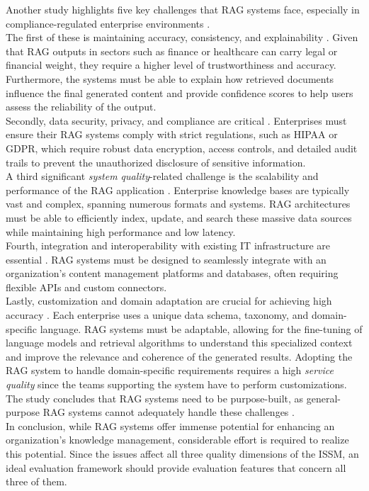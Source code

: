 \documentclass[
	english,
	ruledheaders=section,%
	class=report,%
	thesis={type=bachelor},%
	accentcolor=1b,%
	custommargins=true,%
	marginpar=false,%
	parskip=half-,%
	fontsize=11pt,%
	DIV=14,
]{tudapub}
\begin{document}
Another study highlights five key challenges that RAG systems face, especially in compliance-regulated enterprise environments \parencite[p.~6]{Bruckhaus2024RAG}.\\
The first of these is maintaining accuracy, consistency, and explainability \parencite[p.~6]{Bruckhaus2024RAG}. Given that RAG outputs in sectors such as finance or healthcare can carry legal or financial weight, they require a higher level of trustworthiness and accuracy. Furthermore, the systems must be able to explain how retrieved documents influence the final generated content and provide confidence scores to help users assess the reliability of the output.\\
Secondly, data security, privacy, and compliance are critical \parencite[p.~6]{Bruckhaus2024RAG}. Enterprises must ensure their RAG systems comply with strict regulations, such as HIPAA or GDPR, which require robust data encryption, access controls, and detailed audit trails to prevent the unauthorized disclosure of sensitive information.\\
A third significant \textit{system quality}-related challenge is the scalability and performance of the RAG application \parencite[p.~6]{Bruckhaus2024RAG}. Enterprise knowledge bases are typically vast and complex, spanning numerous formats and systems. RAG architectures must be able to efficiently index, update, and search these massive data sources while maintaining high performance and low latency.\\
Fourth, integration and interoperability with existing IT infrastructure are essential \parencite[p.~6]{Bruckhaus2024RAG}. RAG systems must be designed to seamlessly integrate with an organization's content management platforms and databases, often requiring flexible APIs and custom connectors.\\
Lastly, customization and domain adaptation are crucial for achieving high accuracy \parencite[p.~6]{Bruckhaus2024RAG}. Each enterprise uses a unique data schema, taxonomy, and domain-specific language. RAG systems must be adaptable, allowing for the fine-tuning of language models and retrieval algorithms to understand this specialized context and improve the relevance and coherence of the generated results. Adopting the RAG system to handle domain-specific requirements requires a high \textit{service quality} since the teams supporting the system have to perform customizations.\\
The study concludes that RAG systems need to be purpose-built, as general-purpose RAG systems cannot adequately handle these challenges \parencite[pp.~5--6]{Bruckhaus2024RAG}.\\
In conclusion, while RAG systems offer immense potential for enhancing an organization's knowledge management, considerable effort is required to realize this potential. Since the issues affect all three quality dimensions of the ISSM, an ideal evaluation framework should provide evaluation features that concern all three of them.
\end{document}
